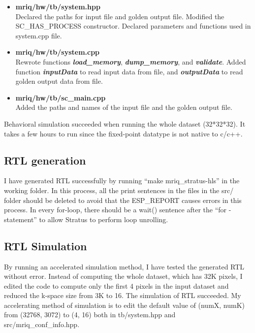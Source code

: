 \begin{itemize}
\item \textbf{mriq/hw/tb/system.hpp} \\
Declared the paths for input file and golden output file. Modified the 
SC\_HAS\_PROCESS constructor. Declared parameters and functions used in 
system.cpp file.

\item \textbf{mriq/hw/tb/system.cpp} \\
Rewrote functions \textbf{\textit{load\_memory}}, \textbf{\textit{dump\_memory}},
 and \textbf{\textit{validate}}. Added function \textbf{\textit{inputData}} to 
read input data from file, and \textbf{\textit{outputData}} to read golden 
output data from file.

\item \textbf{mriq/hw/tb/sc\_main.cpp} \\
Added the paths and names of the input file and the golden output file.
\end{itemize}

Behavioral simulation succeeded when running the whole dataset (32*32*32). 
It takes a few hours to run since the fixed-point datatype is not native to c/c++. 

\subsection{RTL generation}
I have generated RTL successfully by running ``make mriq\_stratus-hls'' in the working
 folder. In this process, all the print sentences in the files in the src/ 
folder should be deleted to avoid that the ESP\_REPORT causes errors in this 
process. In every for-loop, there should be a wait() sentence after the ``for
-statement'' to allow Stratus to perform loop unrolling.

\subsection{RTL Simulation}
By running an accelerated simulation method, I have tested the generated RTL
 without error. Instead of computing the whole dataset, which has 32K pixels, 
I edited the code to compute only the first 4 pixels in the input dataset and
 reduced the k-space size from 3K to 16. The simulation of RTL succeeded. 
My accelerating method of simulation is to edit the default value of (numX, numK) 
from (32768, 3072) to (4, 16) both in tb/system.hpp and src/mriq\_conf\_info.hpp. 
